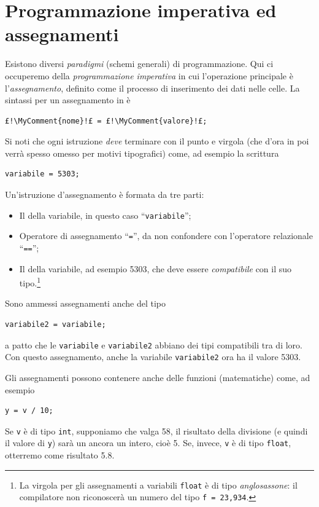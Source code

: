 	\section{Programmazione imperativa ed assegnamenti}
Esistono diversi \emph{paradigmi} (schemi generali) di programmazione.
Qui ci occuperemo della \emph{programmazione imperativa} in cui l'operazione principale è l'\emph{assegnamento}, definito come il processo di inserimento dei dati nelle celle.
La sintassi per un assegnamento in  è 
\begin{lstlisting}
£!\MyComment{nome}!£ = £!\MyComment{valore}!£;
\end{lstlisting}
Si noti che ogni istruzione \emph{deve} terminare con il punto e virgola (che d'ora in poi verrà spesso omesso per motivi tipografici) come, ad esempio la scrittura
\begin{lstlisting}
variabile = 5303;
\end{lstlisting}
Un'istruzione d'assegnamento è formata da tre parti:
\begin{itemize}
	\item
Il  della variabile, in questo caso ``\lstinline!variabile!'';
	\item
Operatore di assegnamento ``\lstinline!=!'', da non confondere con l'operatore relazionale ``\lstinline!==!'';
	\item
Il  della variabile, ad esempio \num{5303}, che deve essere \emph{compatibile} con il suo tipo.\footnote{%
La virgola per gli assegnamenti a variabili \lstinline!float! è di tipo \emph{anglosassone}: il compilatore non riconoscerà un numero del tipo \lstinline!f = 23,934!.
}
\end{itemize}
Sono ammessi assegnamenti anche del tipo
\begin{lstlisting}
variabile2 = variabile;
\end{lstlisting}
a patto che le \lstinline!variabile! e \lstinline!variabile2! abbiano dei tipi compatibili tra di loro.
Con questo assegnamento, anche la variabile \lstinline!variabile2! ora ha il valore \num{5303}.


Gli assegnamenti possono contenere anche delle funzioni (matematiche) come, ad esempio
\begin{lstlisting}
y = v / 10;
\end{lstlisting}
Se \lstinline!v! è di tipo \lstinline!int!, supponiamo che valga \num{58}, il risultato della divisione (e quindi il valore di \lstinline!y!) sarà un ancora un intero, cioè \num{5}.
Se, invece, \lstinline!v! è di tipo \lstinline!float!, otterremo come risultato \num{5.8}.


